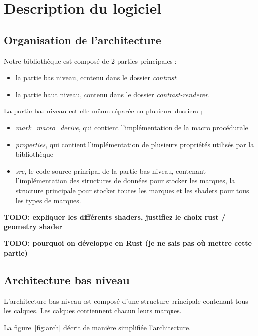 \documentclass[12pt]{article}
\begin{document}
\section{Description du logiciel}
\subsection{Organisation de l'architecture}

Notre bibliothèque est composé de 2 parties principales :
\begin{itemize}
\item la partie bas niveau, contenu dans le dossier \textit{contrast}
\item la partie haut niveau, contenu dans le dossier  \textit{contrast-renderer}.
\end{itemize}

La partie bas niveau est elle-même séparée en plusieurs dossiers ;
\begin{itemize}
\item \textit{mark\_macro\_derive}, qui contient l'implémentation de la macro procédurale
\item \textit{properties}, qui contient l'implémentation de plusieurs propriétés utilisés par la bibliothèque
\item \textit{src}, le code source principal de la partie bas niveau, contenant l'implémentation des structures de données pour stocker les marques, la structure principale pour stocker toutes les marques et les shaders pour tous les types de marques.
\end{itemize}

\textbf{TODO: expliquer les différents shaders, justifiez le choix rust / geometry shader}

\textbf{TODO: pourquoi on développe en Rust (je ne sais pas où mettre cette partie)}

\subsection{Architecture bas niveau}

L'architecture bas niveau est composé d'une structure principale contenant tous les calques. Les calques contiennent
chacun leurs marques.

La figure~\ref{fig:arch} décrit de manière simplifiée l'architecture.
\end{document}
